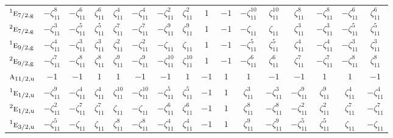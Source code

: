 \documentclass[10pt,a4paper]{article}
\numberwithin{equation}{section}
\newcommand{\irr}[1]{\text{\normalfont\scshape #1}}
\newcommand{\conjpair}[1]{{}^{#1}}
\newcommand{\ptag}[1]{\mathrm{#1}}
\newcommand{\rootunity}[1]{\zeta_{#1}}
\begin{document}
{\begin{longtable}{@{}lccccccccccccccc@{}}
$\conjpair{1}\irr{e}_{7/2,\ptag{g}}$ & $-\rootunity{11}^{8}$ & $-\rootunity{11}^{6}$ & $\rootunity{11}^{6}$ & $\rootunity{11}^{4}$ & $-\rootunity{11}^{4}$ & $-\rootunity{11}^{2}$ & $\rootunity{11}^{2}$ & $1$ & $-1$ & $-\rootunity{11}^{10}$ & $\rootunity{11}^{10}$ & $\rootunity{11}^{8}$ & $-\rootunity{11}^{8}$ & $-\rootunity{11}^{6}$ & $\rootunity{11}^{6}$\\
$\conjpair{2}\irr{e}_{7/2,\ptag{g}}$ & $-\rootunity{11}^{3}$ & $-\rootunity{11}^{5}$ & $\rootunity{11}^{5}$ & $\rootunity{11}^{7}$ & $-\rootunity{11}^{7}$ & $-\rootunity{11}^{9}$ & $\rootunity{11}^{9}$ & $1$ & $-1$ & $-\rootunity{11}$ & $\rootunity{11}$ & $\rootunity{11}^{3}$ & $-\rootunity{11}^{3}$ & $-\rootunity{11}^{5}$ & $\rootunity{11}^{5}$\\
$\conjpair{1}\irr{e}_{9/2,\ptag{g}}$ & $-\rootunity{11}^{4}$ & $-\rootunity{11}^{3}$ & $\rootunity{11}^{3}$ & $\rootunity{11}^{2}$ & $-\rootunity{11}^{2}$ & $-\rootunity{11}$ & $\rootunity{11}$ & $1$ & $-1$ & $-\rootunity{11}^{5}$ & $\rootunity{11}^{5}$ & $\rootunity{11}^{4}$ & $-\rootunity{11}^{4}$ & $-\rootunity{11}^{3}$ & $\rootunity{11}^{3}$\\
$\conjpair{2}\irr{e}_{9/2,\ptag{g}}$ & $-\rootunity{11}^{7}$ & $-\rootunity{11}^{8}$ & $\rootunity{11}^{8}$ & $\rootunity{11}^{9}$ & $-\rootunity{11}^{9}$ & $-\rootunity{11}^{10}$ & $\rootunity{11}^{10}$ & $1$ & $-1$ & $-\rootunity{11}^{6}$ & $\rootunity{11}^{6}$ & $\rootunity{11}^{7}$ & $-\rootunity{11}^{7}$ & $-\rootunity{11}^{8}$ & $\rootunity{11}^{8}$\\
$\irr{a}_{11/2,\ptag{u}}$ & $-1$ & $-1$ & $1$ & $1$ & $-1$ & $-1$ & $1$ & $-1$ & $1$ & $1$ & $-1$ & $-1$ & $1$ & $1$ & $-1$\\
$\conjpair{1}\irr{e}_{1/2,\ptag{u}}$ & $-\rootunity{11}^{9}$ & $-\rootunity{11}^{4}$ & $\rootunity{11}^{4}$ & $\rootunity{11}^{10}$ & $-\rootunity{11}^{10}$ & $-\rootunity{11}^{5}$ & $\rootunity{11}^{5}$ & $-1$ & $1$ & $\rootunity{11}^{3}$ & $-\rootunity{11}^{3}$ & $-\rootunity{11}^{9}$ & $\rootunity{11}^{9}$ & $\rootunity{11}^{4}$ & $-\rootunity{11}^{4}$\\
$\conjpair{2}\irr{e}_{1/2,\ptag{u}}$ & $-\rootunity{11}^{2}$ & $-\rootunity{11}^{7}$ & $\rootunity{11}^{7}$ & $\rootunity{11}$ & $-\rootunity{11}$ & $-\rootunity{11}^{6}$ & $\rootunity{11}^{6}$ & $-1$ & $1$ & $\rootunity{11}^{8}$ & $-\rootunity{11}^{8}$ & $-\rootunity{11}^{2}$ & $\rootunity{11}^{2}$ & $\rootunity{11}^{7}$ & $-\rootunity{11}^{7}$\\
$\conjpair{1}\irr{e}_{3/2,\ptag{u}}$ & $-\rootunity{11}^{5}$ & $-\rootunity{11}$ & $\rootunity{11}$ & $\rootunity{11}^{8}$ & $-\rootunity{11}^{8}$ & $-\rootunity{11}^{4}$ & $\rootunity{11}^{4}$ & $-1$ & $1$ & $\rootunity{11}^{9}$ & $-\rootunity{11}^{9}$ & $-\rootunity{11}^{5}$ & $\rootunity{11}^{5}$ & $\rootunity{11}$ & $-\rootunity{11}$\\

\end{longtable}}
\end{document}
